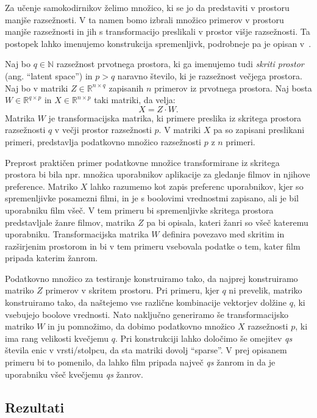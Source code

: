 \documentclass[12pt,a4paper,twoside]{article}
\theoremstyle{definition} %
\theoremstyle{plain} %
\numberwithin{equation}{section}  %
\newcommand{\R}{\mathbb R}
\newcommand{\N}{\mathbb N}
\begin{document}
Za učenje samokodirnikov želimo množico, ki se jo da predstaviti v prostoru manjše razsežnosti.
V ta namen bomo izbrali množico primerov v prostoru manjše razsežnosti in jih s transformacijo preslikali v prostor višje razsežnosti.
Ta postopek lahko imenujemo konstrukcija spremenljivk, podrobneje pa je opisan v~\cite[razdelek\ 10.3]{flach2012machine}.

Naj bo $q \in \N$ razsežnost prvotnega prostora, ki ga imenujemo tudi \emph{skriti prostor} (ang. ``latent space'')
in $p > q$ naravno število, ki je razsežnost večjega prostora.
Naj bo v matriki $Z \in \R^{n \times q}$ zapisanih $n$ primerov iz prvotnega prostora.
Naj bosta $W \in \R^{q \times p}$ in $X \in \R^{n \times p}$ taki matriki, da velja:
\[
	X = Z \cdot W.
\]
Matrika $W$ je transformacijska matrika, ki primere preslika iz skritega prostora razsežnosti $q$ v večji prostor razsežnosti $p$.
V matriki $X$ pa so zapisani preslikani primeri, predstavlja podatkovno množico razsežnosti $p$ z $n$ primeri.

Preprost praktičen primer podatkovne množice transformirane iz skritega prostora bi bila npr. množica uporabnikov aplikacije za gledanje filmov in njihove preference.
Matriko $X$ lahko razumemo kot zapis preferenc uporabnikov, kjer so spremenljivke posamezni filmi, in je s boolovimi vrednostmi zapisano, ali je bil uporabniku film všeč.
V tem primeru bi spremenljivke skritega prostora predstavljale žanre filmov, matrika $Z$ pa bi opisala, kateri žanri so všeč kateremu uporabniku.
Transformacijska matrika $W$ definira povezavo med skritim in razširjenim prostorom in bi v tem primeru vsebovala podatke o tem, kater film pripada katerim žanrom.

Podatkovno množico za testiranje konstruiramo tako, da najprej konstruiramo matriko $Z$ primerov v skritem prostoru.
Pri primeru, kjer $q$ ni prevelik, matriko konstruiramo tako, da naštejemo vse različne kombinacije vektorjev dolžine $q$, ki vsebujejo boolove vrednosti.
Nato naključno generiramo še transformacijsko matriko $W$ in ju pomnožimo, da dobimo podatkovno množico $X$ razsežnosti $p$, ki ima rang velikosti kvečjemu $q$.
Pri konstrukciji lahko določimo še omejitev \textit{qs} števila enic v vrsti/stolpcu, da sta matriki dovolj ``sparse''.
V prej opisanem primeru bi to pomenilo, da lahko film pripada največ \textit{qs} žanrom in da je uporabniku všeč kvečjemu \textit{qs} žanrov.

\subsection{Rezultati}
\label{pogl:rezultati}
\end{document}
